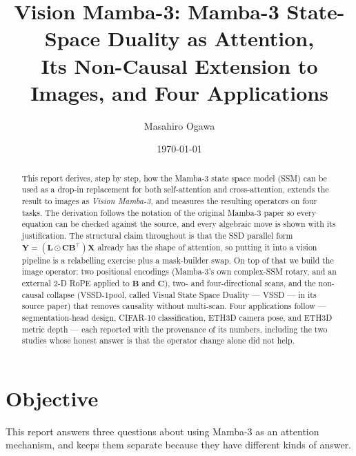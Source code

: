 \documentclass[11pt,a4paper]{article}
\title{Vision Mamba-3: Mamba-3 State-Space Duality as Attention,\\
       Its Non-Causal Extension to Images, and Four Applications}
\author{Masahiro Ogawa}
\date{\today}
\begin{document}
\maketitle

\begin{abstract}
This report derives, step by step, how the Mamba-3 state space model (SSM) can be
used as a drop-in replacement for both self-attention and cross-attention, extends
the result to images as \emph{Vision Mamba-3}, and measures the resulting operators
on four tasks. The derivation follows the notation of the original Mamba-3 paper so
every equation can be checked against the source, and every algebraic move is shown
with its justification. The structural claim throughout is that the SSD parallel
form $\bm{Y}=(\bm{L}\odot\bm{C}\bm{B}^\top)\bm{X}$ already has the shape of
attention, so putting it into a vision pipeline is a relabelling exercise plus a
mask-builder swap. On top of that we build the image operator: two positional
encodings (Mamba-3's own complex-SSM rotary, and an external 2-D RoPE applied to
$\bm{B}$ and $\bm{C}$), two- and four-directional scans, and the non-causal collapse
(VSSD-1pool, called Visual State Space Duality --- VSSD --- in its source paper) that
removes causality without multi-scan. Four applications
follow --- segmentation-head design, CIFAR-10 classification, ETH3D camera pose, and
ETH3D metric depth --- each reported with the provenance of its numbers, including
the two studies whose honest answer is that the operator change alone did not help.
\end{abstract}

\tableofcontents

\section{Objective}
\label{sec:objective}

This report answers three questions about using Mamba-3 as an attention mechanism,
and keeps them separate because they have different kinds of answer.
\end{document}
